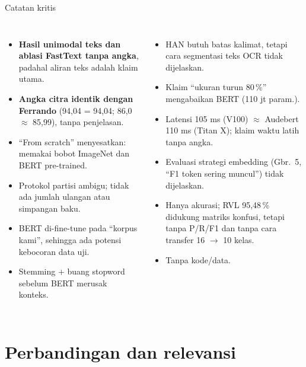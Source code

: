 \documentclass[aspectratio=169,10pt]{beamer}
\newcommand\kecil{\fontsize{8}{9.5}\selectfont}
\newcommand\awas[1]{\textcolor{merah}{\textbf{#1}}}
\begin{document}
\begin{frame}{Catatan kritis}
  \begin{columns}[T]
    \begin{itemize}\kecil
      \item \awas{Hasil unimodal teks dan ablasi FastText tanpa angka}, padahal aliran teks adalah klaim utama.
      \item \awas{Angka citra identik dengan Ferrando} (94,04 = 94,04; 86,0 $\approx$ 85,99), tanpa penjelasan.
      \item ``From scratch'' menyesatkan: memakai bobot ImageNet dan BERT pre-trained.
      \item Protokol partisi ambigu; tidak ada jumlah ulangan atau simpangan baku.
      \item BERT di-fine-tune pada ``korpus kami'', sehingga ada potensi kebocoran data uji.
      \item Stemming + buang stopword sebelum BERT merusak konteks.
    \end{itemize}
    \begin{itemize}\kecil
      \item HAN butuh batas kalimat, tetapi cara segmentasi teks OCR tidak dijelaskan.
      \item Klaim ``ukuran turun 80\,\%'' mengabaikan BERT (110 jt param.).
      \item Latensi 105 ms (V100) $\approx$ Audebert 110 ms (Titan X); klaim waktu latih tanpa angka.
      \item Evaluasi strategi embedding (Gbr.\ 5, ``F1 token sering muncul'') tidak dijelaskan.
      \item Hanya akurasi; RVL 95,48\,\% didukung matriks konfusi, tetapi tanpa P/R/F1 dan tanpa cara transfer 16 $\to$ 10 kelas.
      \item Tanpa kode/data.
    \end{itemize}
  \end{columns}
\end{frame}

\section{Perbandingan dan relevansi}
\end{document}
